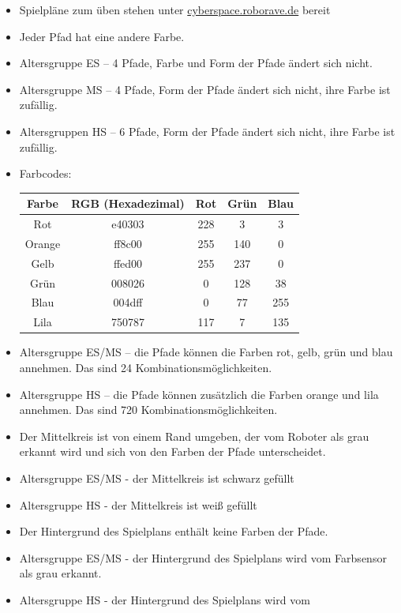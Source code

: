 \documentclass[a4paper,12pt]{article}
\begin{document}
\begin{itemize}
	\item Spielpläne zum üben stehen unter
\href{https://www.cyberspace.roborave.de/lab/}{cyberspace.roborave.de} bereit
	\item Jeder Pfad hat eine andere Farbe.
	\item Altersgruppe ES – 4 Pfade, Farbe und Form der Pfade ändert sich
	nicht.
	\item Altersgruppe MS – 4 Pfade, Form der Pfade ändert sich nicht,
	ihre Farbe ist zufällig.
	\item Altersgruppen HS – 6 Pfade, Form der Pfade ändert sich nicht,
	ihre Farbe ist zufällig.
	\item Farbcodes:
\begin{center}
	\begin{tabular}{|c|c|c|c|c|} \hline
		Farbe & RGB (Hexadezimal) & Rot & Grün & Blau \\ \hline
    		Rot & e40303 & 228 & 3 & 3 \\
    		Orange & ff8c00 & 255 & 140 & 0 \\
    		Gelb & ffed00 & 255 & 237 & 0 \\
    		Grün & 008026 & 0 & 128 & 38 \\
    		Blau & 004dff & 0 & 77 & 255 \\
    		Lila & 750787 & 117 & 7 & 135 \\ \hline
	\end{tabular}
\end{center}
	\item Altersgruppe ES/MS – die Pfade können die Farben rot, gelb, grün
		und blau annehmen. Das sind 24 Kombinationsmöglichkeiten.
	\item Altersgruppe HS – die Pfade können zusätzlich die Farben orange
		und lila annehmen. Das sind 720 Kombinationsmöglichkeiten.
	\item Der Mittelkreis ist von einem Rand umgeben, der vom Roboter als
		grau erkannt wird und sich von den Farben der Pfade
		unterscheidet.
	\item Altersgruppe ES/MS - der Mittelkreis ist schwarz gefüllt
	\item Altersgruppe HS - der Mittelkreis ist weiß gefüllt
	\item Der Hintergrund des Spielplans enthält keine Farben der Pfade.
	\item Altersgruppe ES/MS - der Hintergrund des Spielplans wird vom
		Farbsensor als grau erkannt.
	\item Altersgruppe HS - der Hintergrund des Spielplans wird vom

\end{itemize}
\end{document}

